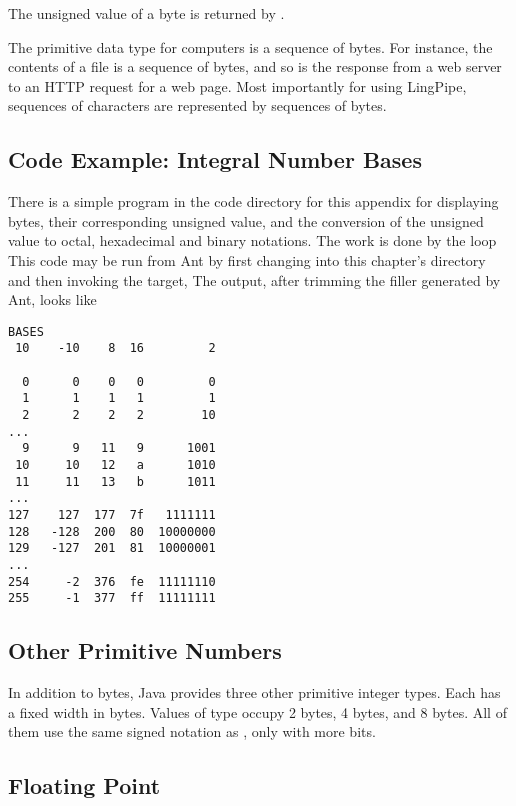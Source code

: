 The unsigned value of a byte  is returned by .  

The primitive data type for computers is a sequence of bytes.  For
instance, the contents of a file is a sequence of bytes, and so
is the response from a web server to an HTTP request for a web page.
Most importantly for using LingPipe, sequences of characters are
represented by sequences of bytes.

\subsection{Code Example: Integral Number Bases}

There is a simple program in the code directory for this appendix
%
%
for displaying bytes, their corresponding unsigned value, and the
conversion of the unsigned value to octal, hexadecimal and binary
notations.  The work is done by the loop
%
%
This code may be run from Ant by first changing into this chapter's
directory and then invoking the \code{byte-table} target,
%
%
%
The output, after trimming the filler generated by Ant, looks like
%
\begin{verbatim}
BASES
 10    -10    8  16         2

  0      0    0   0         0
  1      1    1   1         1
  2      2    2   2        10
...
  9      9   11   9      1001
 10     10   12   a      1010
 11     11   13   b      1011
...
127    127  177  7f   1111111
128   -128  200  80  10000000
129   -127  201  81  10000001
...
254     -2  376  fe  11111110
255     -1  377  ff  11111111
\end{verbatim}

\subsection{Other Primitive Numbers}

In addition to bytes, Java provides three other primitive integer
types.  Each has a fixed width in bytes.  Values of type 
occupy 2 bytes, \code{int} 4 bytes, and \code{long} 8 bytes.  All of
them use the same signed notation as \code{byte}, only with more bits.

\subsection{Floating Point}

